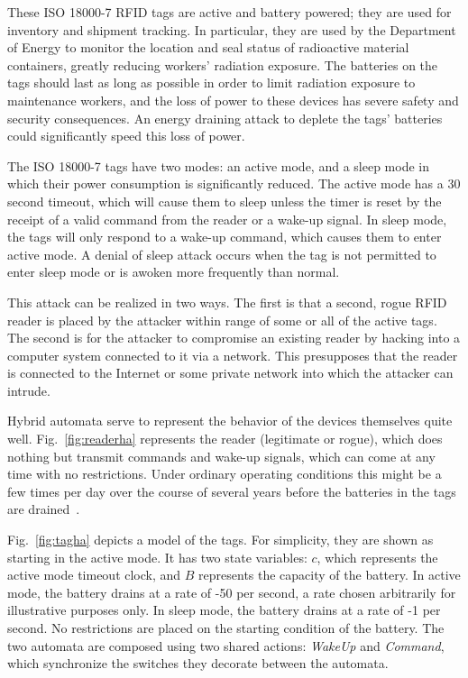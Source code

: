 These ISO 18000-7 RFID tags are active and battery powered; they are used for inventory and
shipment tracking. In particular, they are used by the Department of Energy to monitor
the location and seal status of
radioactive material containers, greatly reducing workers' radiation exposure. 
The batteries on the tags should last as long as
possible in order to limit radiation exposure to maintenance workers, and
the loss of power to these devices has severe safety and security consequences.
An energy draining attack to deplete the tags' batteries could significantly
speed this loss of power.

The ISO 18000-7 tags have two modes: an active mode, and a sleep mode in which their
power consumption is significantly reduced. The active mode has a 30 second timeout,
which will cause them to sleep unless the timer is reset by the receipt of a valid
command from the reader or a wake-up signal. In sleep mode, the tags will only respond to a
wake-up command, which causes them to enter active mode.
A denial of sleep attack occurs when the tag is not permitted to enter sleep mode or is
awoken more frequently than normal.

This attack can be realized in two ways. The first is that a second, rogue 
RFID reader is placed by the attacker within range of some or all of the active tags. The
second is for the attacker to compromise an existing reader by hacking into a computer
system connected to it via a network. This presupposes that the reader is connected
to the Internet or some private network into which the attacker can intrude.

Hybrid automata serve to represent the behavior of the devices themselves quite well.
Fig.~\ref{fig:readerha} represents the reader (legitimate or rogue), which does nothing but 
transmit commands and
wake-up signals, which can come at any time with no restrictions. Under ordinary operating
conditions this might be a few times per day over the course of several years before the
batteries in the tags are drained~\cite{chen2009radiofrequency}.

Fig.~\ref{fig:tagha} depicts a model of the tags. For simplicity, they are shown as starting in
the active mode. It has two state variables: $c$, which represents the active mode timeout
clock, and $B$ represents the capacity of the battery. In active mode, the battery drains at
a rate of -50 per second, a rate chosen arbitrarily for illustrative purposes only. In sleep mode,
the battery drains at a rate of -1 per second. No restrictions are placed on the starting condition
of the battery. The two automata are composed using two shared actions: \emph{WakeUp} and \emph{Command}, which
synchronize the switches they decorate between the automata.

